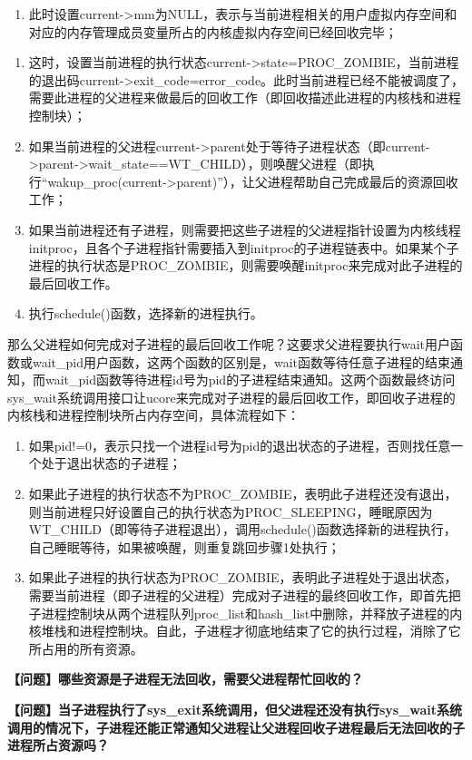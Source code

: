\begin{enumerate}
\def\labelenumi{\alph{enumi}.}
\setcounter{enumi}{2}
\item
  此时设置current-\textgreater{}mm为NULL，表示与当前进程相关的用户虚拟内存空间和对应的内存管理成员变量所占的内核虚拟内存空间已经回收完毕；
\end{enumerate}

\begin{enumerate}
\def\labelenumi{\arabic{enumi}.}
\setcounter{enumi}{1}
\item
  这时，设置当前进程的执行状态current-\textgreater{}state=PROC\_ZOMBIE，当前进程的退出码current-\textgreater{}exit\_code=error\_code。此时当前进程已经不能被调度了，需要此进程的父进程来做最后的回收工作（即回收描述此进程的内核栈和进程控制块）；
\item
  如果当前进程的父进程current-\textgreater{}parent处于等待子进程状态（即current-\textgreater{}parent-\textgreater{}wait\_state==WT\_CHILD），则唤醒父进程（即执行``wakup\_proc(current-\textgreater{}parent)''），让父进程帮助自己完成最后的资源回收工作；
\item
  如果当前进程还有子进程，则需要把这些子进程的父进程指针设置为内核线程initproc，且各个子进程指针需要插入到initproc的子进程链表中。如果某个子进程的执行状态是PROC\_ZOMBIE，则需要唤醒initproc来完成对此子进程的最后回收工作。
\item
  执行schedule()函数，选择新的进程执行。
\end{enumerate}

那么父进程如何完成对子进程的最后回收工作呢？这要求父进程要执行wait用户函数或wait\_pid用户函数，这两个函数的区别是，wait函数等待任意子进程的结束通知，而wait\_pid函数等待进程id号为pid的子进程结束通知。这两个函数最终访问sys\_wait系统调用接口让ucore来完成对子进程的最后回收工作，即回收子进程的内核栈和进程控制块所占内存空间，具体流程如下：

\begin{enumerate}
\def\labelenumi{\arabic{enumi}.}
\item
  如果pid!=0，表示只找一个进程id号为pid的退出状态的子进程，否则找任意一个处于退出状态的子进程；
\item
  如果此子进程的执行状态不为PROC\_ZOMBIE，表明此子进程还没有退出，则当前进程只好设置自己的执行状态为PROC\_SLEEPING，睡眠原因为WT\_CHILD（即等待子进程退出），调用schedule()函数选择新的进程执行，自己睡眠等待，如果被唤醒，则重复跳回步骤1处执行；
\item
  如果此子进程的执行状态为PROC\_ZOMBIE，表明此子进程处于退出状态，需要当前进程（即子进程的父进程）完成对子进程的最终回收工作，即首先把子进程控制块从两个进程队列proc\_list和hash\_list中删除，并释放子进程的内核堆栈和进程控制块。自此，子进程才彻底地结束了它的执行过程，消除了它所占用的所有资源。
\end{enumerate}

\textbf{【问题】哪些资源是子进程无法回收，需要父进程帮忙回收的？}

\textbf{【问题】当子进程执行了sys\_exit系统调用，但父进程还没有执行sys\_wait系统调用的情况下，子进程还能正常通知父进程让父进程回收子进程最后无法回收的子进程所占资源吗？}
